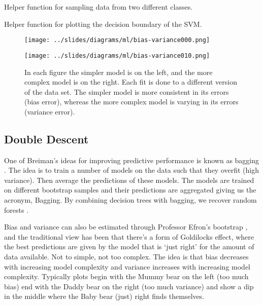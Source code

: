 \documentclass[a4paperpaper,]{article}
\begin{document}
Helper function for sampling data from two different classes.

Helper function for plotting the decision boundary of the SVM.

\begin{figure}[htb]
\begin{center}
\texttt{[image: ../slides/diagrams/ml/bias-variance000.png]}
\end{center}\begin{center}
\texttt{[image: ../slides/diagrams/ml/bias-variance010.png]}
\end{center}


\caption{In each figure the simpler model is on the left, and the more complex model is on the right. Each fit is done to a different version of the data set. The simpler model is more consistent in its errors (bias error), whereas the more complex model is varying in its errors (variance error).}
\label{bias-variance-errors}
\end{figure}

\hypertarget{double-descent}{%
\subsection{Double Descent}\label{double-descent}}


One of Breiman's ideas for improving predictive performance is known as
bagging \citep{Breiman:bagging96}. The idea is to train a number of
models on the data such that they overfit (high variance). Then average
the predictions of these models. The models are trained on different
bootstrap samples \citep{Efron:bootstrap79} and their predictions are
aggregated giving us the acronym, Bagging. By combining decision trees
with bagging, we recover random forests \citep{Breiman-forests01}.

Bias and variance can also be estimated through Professor Efron's
bootstrap \citep{Efron:bootstrap79}, and the traditional view has been
that there's a form of Goldilocks effect, where the best predictions are
given by the model that is `just right' for the amount of data
available. Not to simple, not too complex. The idea is that bias
decreases with increasing model complexity and variance increases with
increasing model complexity. Typically plots begin with the Mummy bear
on the left (too much bias) end with the Daddy bear on the right (too
much variance) and show a dip in the middle where the Baby bear (just)
right finds themselves.
\end{document}
